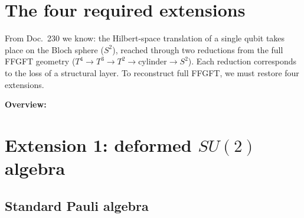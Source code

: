 \section*{The four required extensions}

From Doc.~230 we know: the Hilbert-space translation of a single
qubit takes place on the Bloch sphere ($S^2$), reached through two
reductions from the full FFGFT geometry
($T^4 \to T^3 \to T^2 \to \text{cylinder} \to S^2$). Each reduction
corresponds to the loss of a structural layer. To reconstruct full
FFGFT, we must restore four extensions.

\textbf{Overview:}

\begin{center}
\renewcommand{\arraystretch}{1.4}
{\small
{}
}
\renewcommand{\arraystretch}{1.0}
\end{center}

\section{Extension 1: deformed $SU(2)$ algebra}

\subsection{Standard Pauli algebra}

